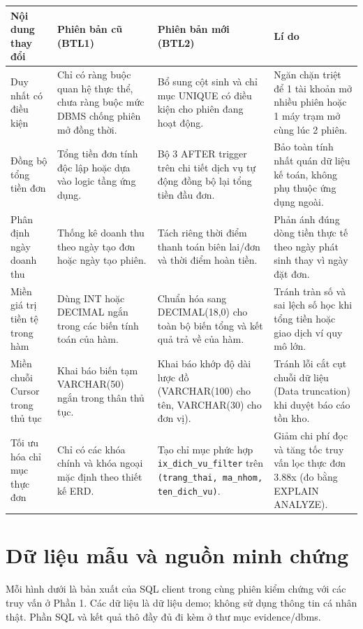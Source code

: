 \begin{longtable}{@{}>{\raggedright\arraybackslash}p{28mm}>{\raggedright\arraybackslash}p{38mm}>{\raggedright\arraybackslash}p{44mm}>{\raggedright\arraybackslash}p{44mm}@{}}\toprule
\textbf{Nội dung thay đổi}&\textbf{Phiên bản cũ (BTL1)}&\textbf{Phiên bản mới (BTL2)}&\textbf{Lí do}\\\midrule\endhead
\bottomrule\endfoot
Duy nhất có điều kiện&Chỉ có ràng buộc quan hệ thực thể, chưa ràng buộc mức DBMS chống phiên mở đồng thời.&Bổ sung cột sinh và chỉ mục UNIQUE có điều kiện cho phiên đang hoạt động.&Ngăn chặn triệt để 1 tài khoản mở nhiều phiên hoặc 1 máy trạm mở cùng lúc 2 phiên.\\\midrule
Đồng bộ tổng tiền đơn&Tổng tiền đơn tính độc lập hoặc dựa vào logic tầng ứng dụng.&Bộ 3 AFTER trigger trên chi tiết dịch vụ tự động đồng bộ lại tổng tiền đầu đơn.&Bảo toàn tính nhất quán dữ liệu kế toán, không phụ thuộc ứng dụng ngoài.\\\midrule
Phân định ngày doanh thu&Thống kê doanh thu theo ngày tạo đơn hoặc ngày tạo phiên.&Tách riêng thời điểm thanh toán biên lai/đơn và thời điểm hoàn tiền.&Phản ánh đúng dòng tiền thực tế theo ngày phát sinh thay vì ngày đặt đơn.\\\midrule
Miền giá trị tiền tệ trong hàm&Dùng INT hoặc DECIMAL ngắn trong các biến tính toán của hàm.&Chuẩn hóa sang DECIMAL(18,0) cho toàn bộ biến tổng và kết quả trả về của hàm.&Tránh tràn số và sai lệch số học khi tổng tiền hoặc giao dịch ví quy mô lớn.\\\midrule
Miền chuỗi Cursor trong thủ tục&Khai báo biến tạm VARCHAR(50) ngắn trong thân thủ tục.&Khai báo khớp độ dài lược đồ (VARCHAR(100) cho tên, VARCHAR(30) cho đơn vị).&Tránh lỗi cắt cụt chuỗi dữ liệu (Data truncation) khi duyệt báo cáo tồn kho.\\\midrule
Tối ưu hóa chỉ mục thực đơn&Chỉ có các khóa chính và khóa ngoại mặc định theo thiết kế ERD.&Tạo chỉ mục phức hợp \texttt{ix\_dich\_vu\_filter} trên \texttt{(trang\_thai, ma\_nhom, ten\_dich\_vu)}.&Giảm chi phí đọc và tăng tốc truy vấn lọc thực đơn 3.88x (đo bằng EXPLAIN ANALYZE).\\\bottomrule
\end{longtable}\endgroup
\chapter{Dữ liệu mẫu và nguồn minh chứng}\label{app:data}
Mỗi hình dưới là bản xuất của SQL client trong cùng phiên kiểm chứng với các truy vấn ở Phần 1. Các dữ liệu là dữ liệu demo; không sử dụng thông tin cá nhân thật. Phần SQL và kết quả thô đầy đủ đi kèm ở thư mục evidence/dbms.

